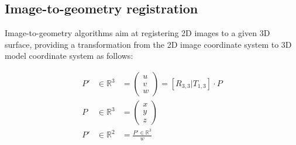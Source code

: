 \documentclass[review]{elsarticle}
\begin{document}


\subsection{Image-to-geometry registration}
\label{sec:algorithms:I2G}


Image-to-geometry algorithms aim at registering 2D images to a given 3D surface, providing a transformation from the 2D image coordinate system to 3D model coordinate system as follows:

\begin{eqnarray}
\label{eq:i2g:projection}
P' &\in \mathds{R}^3 &= \begin{pmatrix}
u \\ v \\ w
\end{pmatrix} = [ R_{3,3} | T_{1,3} ] \cdot P \\
P &\in \mathds{R}^3 &= \begin{pmatrix}
x \\ y \\ z
\end{pmatrix}  \\
P' &\in \mathds{R}^2 &= \frac{P' \in \mathds{R}^3}{w} 
\end{eqnarray}
\end{document}
